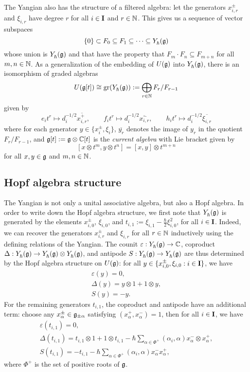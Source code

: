 The Yangian also has the structure of a filtered algebra: let the generators $x^\pm_{i,r}$ and $\xi_{i,r}$ have degree $r$ for all $i\in\mathbf{I}$ and $r\in\mathbb{N}$.
This gives us a sequence of vector subspaces
\[\{0\}\subset F_0\subseteq F_1\subseteq\cdots\subseteq Y_\hbar^{}(\mathfrak{g})\]
whose union is $Y_\hbar^{}(\mathfrak{g})$ and that have the property that $F_m\cdot F_n\subseteq F_{m+n}$ for all $m,n\in\mathbb{N}$.
As a generalization of the embedding of $U(\mathfrak{g})$ into $Y_\hbar^{}(\mathfrak{g})$, there is an isomorphism of graded algebras
\[U(\mathfrak{g}[t]) \cong \operatorname{gr}(Y_\hbar^{}(\mathfrak{g})) := \bigoplus_{r\in\mathbb{N}}F_r/F_{r-1}\]
given by
\[e_it^r\mapsto d_i^{-1/2}\overline{x^+_{i,r}}, \qquad f_it^r\mapsto d_i^{-1/2}\overline{x^-_{i,r}}, \qquad h_it^r\mapsto d_i^{-1/2}\overline{\xi_{i,r}}\]
where for each generator $y\in\{x^\pm_i,\xi_i\}$, $\overline{y_r}$ denotes the image of $y_r$ in the quotient $F_r/F_{r-1}$, and $\mathfrak{g}[t] := \mathfrak{g}\otimes\mathbb{C}[t]$ is the \emph{current algebra} with Lie bracket given by
\[[x\otimes t^m, y\otimes t^n] = [x,y]\otimes t^{m+n}\]
for all $x,y\in\mathfrak{g}$ and $m,n\in\mathbb{N}$.


\subsection{Hopf algebra structure}

The Yangian is not only a unital associative algebra, but also a Hopf algebra.
In order to write down the Hopf algebra structure, we first note that $Y_\hbar^{}(\mathfrak{g})$ is generated by the elements $x^\pm_{i,0}$, $\xi_{i,0}$, and $t_{i,1} := \xi_{i,1}-\frac{\hbar}{2}\xi_{i,0}^2$, for all $i\in\mathbf{I}$.
Indeed, we can recover the generators $x^\pm_{i,r}$ and $\xi_{i,r}$ for all $r\in\mathbb{N}$ inductively using the defining relations of the Yangian.
The counit $\varepsilon:Y_\hbar^{}(\mathfrak{g})\to\mathbb{C}$, coproduct $\Delta:Y_\hbar^{}(\mathfrak{g})\to Y_\hbar^{}(\mathfrak{g})\otimes Y_\hbar^{}(\mathfrak{g})$, and antipode $S:Y_\hbar^{}(\mathfrak{g})\to Y_\hbar^{}(\mathfrak{g})$ are thus determined by the Hopf algebra structure on $U(\mathfrak{g})$: for all $y\in\{x^\pm_{i,0},\xi_{i,0} : i\in\mathbf{I}\}$, we have
\begin{gather*}
    \varepsilon(y) = 0, \\
    \Delta(y) = y\otimes 1 + 1\otimes y, \\
    S(y) = -y.
\end{gather*}
For the remaining generators $t_{i,1}$, the coproduct and antipode have an additional term: choose any $x^\pm_\alpha\in\mathfrak{g}_{\pm\alpha}$ satisfying $(x^+_\alpha,x^-_\alpha)=1$, then for all $i\in\mathbf{I}$, we have
\begin{gather*}
    \varepsilon(t_{i,1}) = 0, \\
    \Delta(t_{i,1}) = t_{i,1}\otimes 1 + 1\otimes t_{i,1} - \hbar\sum_{\alpha\in\Phi^+}(\alpha_i,\alpha) x^-_\alpha \otimes x^+_\alpha, \\
    S(t_{i,1}) = -t_{i,1} - \hbar\sum_{\alpha\in\Phi^+}(\alpha_i,\alpha) x^-_\alpha x^+_\alpha,
\end{gather*}
where $\Phi^+$ is the set of positive roots of $\mathfrak{g}$.

